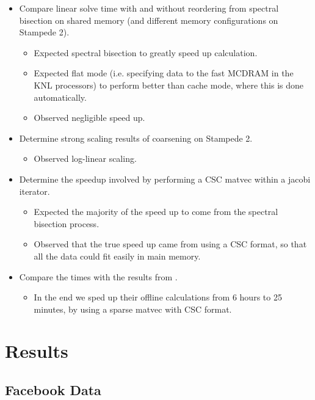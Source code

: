 \documentclass[11pt]{article}
\begin{document}
\begin{itemize}
	\item Compare linear solve time with and without reordering from
spectral bisection on shared memory (and different memory
		configurations on Stampede 2). 
		\begin{itemize}
			\item Expected spectral bisection to greatly speed up
				calculation. 
                        \item Expected flat mode (i.e. specifying data to the
fast MCDRAM in the KNL processors) to perform better than cache mode, where this
is done automatically.
			\item Observed negligible speed up.
		\end{itemize}
	
	\item Determine strong scaling results of coarsening on Stampede 2. 
		\begin{itemize}
			\item Observed log-linear scaling. 
		\end{itemize}
	\item Determine the speedup involved by performing a CSC matvec within a
		jacobi iterator. 
		\begin{itemize}
			\item Expected the majority of the speed up to come from
				the spectral bisection process. 
			\item Observed that the true speed up came from using a
				CSC format, so that all the data could fit
				easily in main memory. 
		\end{itemize}
	\item Compare the times with the results from \cite{xie}.
		\begin{itemize}
			\item In the end we sped up their offline calculations
				from 6 hours to 25 minutes, by using a sparse
				matvec with CSC format. 
		\end{itemize}
\end{itemize}

\section{Results}
\subsection{Facebook Data}
\end{document}
